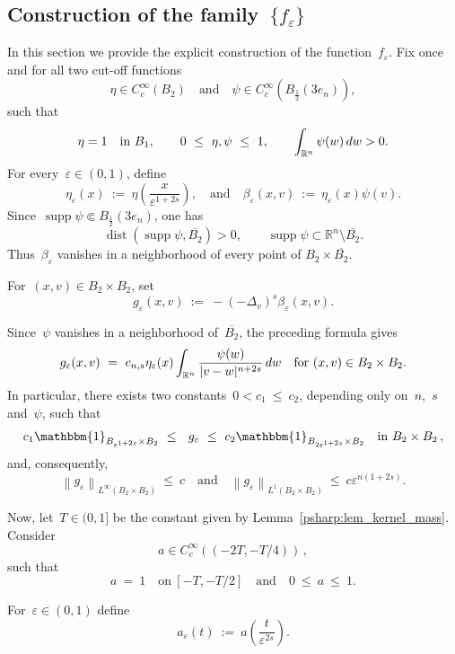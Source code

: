 \documentclass[leqno,10pt]{amsart}
\theoremstyle{plain}
\theoremstyle{remark}
\numberwithin{equation}{section}
\def\dw{\,{\rm d}w}
\def\ern{\mathbb{R}^n}
\newcommand{\eps}{\varepsilon}
\begin{document}
{\subsection{Construction of the family~$\{f_\eps\}$}\label{psharp:subsec_solution}
In this section we provide the explicit construction of the function~$f_\eps$.
Fix once and for all two cut-off functions
\[
\eta\in C_c^\infty(B_2)
\quad\text{and}\quad
\psi\in C_c^\infty(B_\frac{1}{2}(3e_n)),
\]
such that
\[
\eta=1\quad\text{in }B_1,
\qquad 0\ \leq\ \eta,\psi\ \leq\ 1,
\qquad \int_{\ern}\psi(w)\dw>0.
\]
For every~$\eps\in(0,1)$, define
\[
\eta_\eps(x) \ := \ \eta\left(\frac{x}{\eps^{1+2s}}\right),
\quad \text{and} \quad 
\beta_\eps(x,v) \ := \ \eta_\eps(x)\psi(v).
\]
Since~$\operatorname{supp}\psi\Subset B_\frac{1}{2}(3e_n)$, one has
\[
\operatorname{dist}(\operatorname{supp}\psi,\overline{B_2})>0,
\qquad
\operatorname{supp}\psi\subset\ern\setminus\overline{B_2}.
\]
Thus~$\beta_\eps$ vanishes in a neighborhood of every point of
$B_2\times\overline{B_2}$. 

For~$(x,v)\in B_2\times B_2$, set
\begin{equation}\label{def:g-eps}
g_\eps(x,v) \ := \ -(-\Delta_v)^s\beta_\eps(x,v).
\end{equation}


Since~$\psi$ vanishes in a neighborhood of~$\overline{B_2}$, the preceding formula gives
\[
g_\eps(x,v) \ = \ 
 c_{n,s}\eta_\eps(x)
\int_{\mathbb{R}^n}
\frac{\psi(w)}{|v-w|^{n+2s}}\dw \quad 
\text{for}~(x,v)\in B_2\times B_2.
\]
In particular, there exists two constants~$0<c_1\ \leq\  c_2$, depending only on~$n$,~$s$ and~$\psi$, such that
\begin{equation}\label{psharp:eq_gKW_comp}
 c_1\mathbbm{1}_{B_{\eps^{1+2s}}\times B_2} \ \leq\  \
 g_\eps \ \leq\ c_2\mathbbm{1}_{B_{2\eps^{1+2s}}\times B_2}
\quad \text{in}~B_2 \times B_2\,,
\end{equation}
and, consequently,
\begin{equation}\label{psharp:eq_gKW_bounds}
\left\|g_\eps\right\|_{L^\infty(B_2 \times B_2)}
\ \leq\ c \quad \text{and} \quad 
\left\|g_\eps\right\|_{L^1(B_2\times B_2)} \ \leq\ c\eps^{n(1+2s)}.
\end{equation}

Now, let~$T\in(0,1]$ be the constant given by Lemma~\ref{psharp:lem_kernel_mass}.  Consider
\[
a\in C_c^\infty((-2T,-T/4))\,,
\]
such that
\[
a \ = \ 1
\quad
\text{on}~[-T,-T/2] \quad \text{and} \quad 0 \ \leq\ a \ \leq\  1.
\]

For~$\eps\in(0,1)$ define
\[
a_\eps(t) \ := \ a\left(\frac{t}{\eps^{2s}}\right).
\]


}
\end{document}
